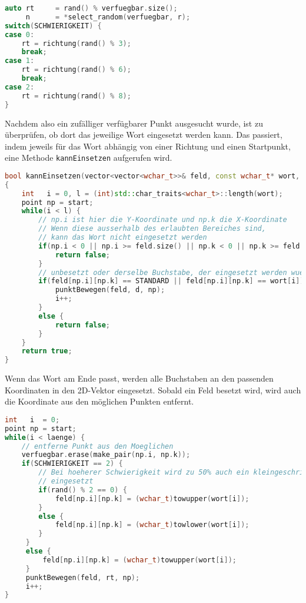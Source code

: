 \documentclass[a4paper,10pt,ngerman]{scrartcl}
\begin{document}
\begin{lstlisting}[language=C++]
auto rt     = rand() % verfuegbar.size();
     n      = *select_random(verfuegbar, r);
switch(SCHWIERIGKEIT) {
case 0:
    rt = richtung(rand() % 3);
    break;
case 1:
    rt = richtung(rand() % 6);
    break;
case 2:
    rt = richtung(rand() % 8);
}
\end{lstlisting}

Nachdem also ein zufälliger verfügbarer Punkt ausgesucht wurde, ist zu überprüfen, ob dort das jeweilige Wort 
eingesetzt werden kann. Das passiert, indem jeweils für das Wort abhängig von einer Richtung und einen 
Startpunkt, eine Methode \lstinline{kannEinsetzen} aufgerufen wird.

\begin{lstlisting}[language=C++]
bool kannEinsetzen(vector<vector<wchar_t>>& feld, const wchar_t* wort, point start, richtung d)
{
    int   i = 0, l = (int)std::char_traits<wchar_t>::length(wort);
    point np = start;
    while(i < l) {
    	// np.i ist hier die Y-Koordinate und np.k die X-Koordinate
    	// Wenn diese ausserhalb des erlaubten Bereiches sind,
    	// kann das Wort nicht eingesetzt werden
        if(np.i < 0 || np.i >= feld.size() || np.k < 0 || np.k >= feld[0].size()) {
            return false;
        }
        // unbesetzt oder derselbe Buchstabe, der eingesetzt werden wuerde
        if(feld[np.i][np.k] == STANDARD || feld[np.i][np.k] == wort[i]) {
            punktBewegen(feld, d, np);
            i++;
        }
        else {
            return false;
        }
    }
    return true;
}
\end{lstlisting}
Wenn das Wort am Ende passt, werden alle Buchstaben an den passenden Koordinaten in den 2D-Vektor eingesetzt.
Sobald ein Feld besetzt wird, wird auch die Koordinate aus den möglichen Punkten entfernt.
\begin{lstlisting}[language=C++]
int   i  = 0;
point np = start;
while(i < laenge) {
	// entferne Punkt aus den Moeglichen
    verfuegbar.erase(make_pair(np.i, np.k));
    if(SCHWIERIGKEIT == 2) {
    	// Bei hoeherer Schwierigkeit wird zu 50% auch ein kleingeschriebener Buchstabe
    	// eingesetzt
        if(rand() % 2 == 0) {
            feld[np.i][np.k] = (wchar_t)towupper(wort[i]);
        }
        else {
            feld[np.i][np.k] = (wchar_t)towlower(wort[i]);
        }
     }
     else {
         feld[np.i][np.k] = (wchar_t)towupper(wort[i]);
     }
     punktBewegen(feld, rt, np);
     i++;
}
\end{lstlisting}
\end{document}
